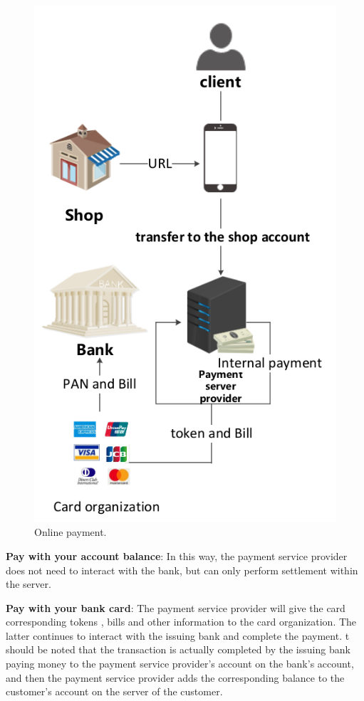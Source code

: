 \documentclass[journal]{IEEEtran}
\begin{document}
\begin{figure}[htbp]
\centerline{\includegraphics[scale=0.5]{Onlie_pay.png}}
\caption{Online payment.}
\label{fig}
\end{figure}

\textbf{Pay with your account balance}: In this way, the payment service provider does not need to interact with the bank, but can only perform settlement within the server.

\textbf{Pay with your bank card}: The payment service provider will give the card corresponding tokens , bills and other information to the card organization. The latter continues to interact with the issuing bank and complete the payment. t should be noted that the transaction is actually completed by the issuing bank paying money to the payment service provider's account on the bank's account, and then the payment service provider adds the corresponding balance to the customer's account on the server of the customer.
\end{document}
